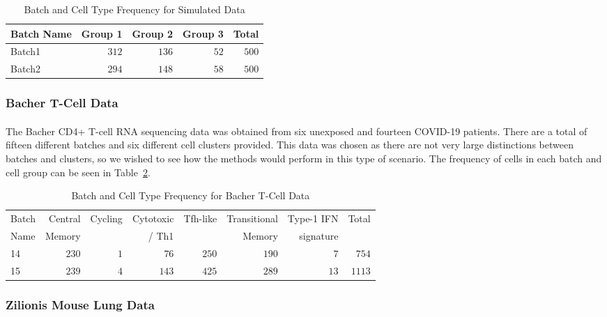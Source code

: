 \documentclass[
12pt, %
letterpaper, %
oneside, %
headinclude,footinclude, %
BCOR5mm, %
]{scrartcl}
\begin{document}
\begin{table}[ht]
    \caption{Batch and Cell Type Frequency for Simulated Data}
    \centering
    \begin{tabular}{lrrrr}
    \toprule
    Batch Name & Group 1 & Group 2 & Group 3 & Total \\
    \midrule
    Batch1 & $312$ & $136$ & $52$ & $500$ \\
    Batch2 & $294$ & $148$ & $58$ & $500$ \\
    \bottomrule
    \end{tabular}
    \label{tab:freq_simdata}
\end{table}

\subsubsection*{Bacher T-Cell Data}

\paragraph*{}
The Bacher CD4+ T-cell RNA sequencing data \citep{bacher2020low} was obtained from six unexposed and fourteen COVID-19 patients. There are a total of fifteen different batches and six different cell clusters provided. This data was chosen as there are not very large distinctions between batches and clusters, so we wished to see how the methods would perform in this type of scenario. The frequency of cells in each batch and cell group can be seen in Table~\ref{tab:freq_bacher}.

\begin{table}[ht]
    \caption{Batch and Cell Type Frequency for Bacher T-Cell Data}
    \centering
    \begin{tabular}{lrrrrrrr}
    \toprule
    Batch & Central  & Cycling & Cytotoxic & Tfh-like & Transitional & Type-1 IFN  & Total \\
    Name  & Memory   &         &  / Th1    &          & Memory       & signature   &       \\
    \midrule
    14 & $230$ & $1$ &  $76$ & $250$ & $190$ &  $7$ &  $754$ \\
    15 & $239$ & $4$ & $143$ & $425$ & $289$ & $13$ & $1113$ \\
    \bottomrule
    \end{tabular}
    \label{tab:freq_bacher}
\end{table}

\subsubsection*{Zilionis Mouse Lung Data}
\end{document}
